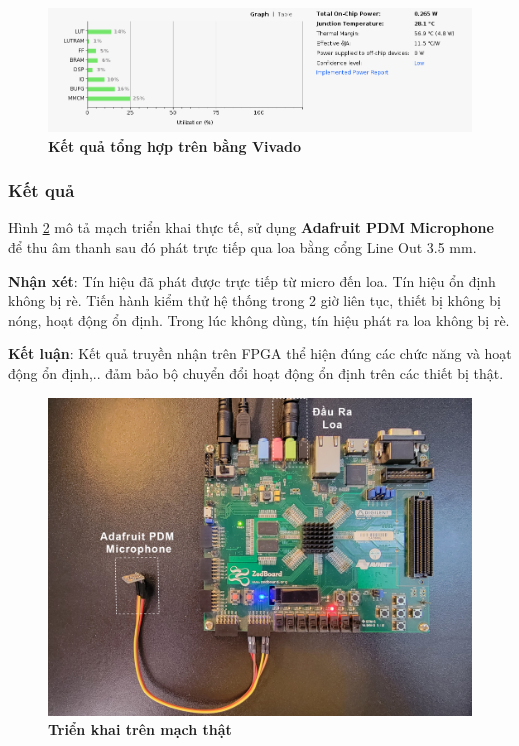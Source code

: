 \begin{figure}[H]
    \centering
    \includegraphics[width=14cm]{Images/Chuong5/fpga/syn_fpga.png}
    \caption[Kết quả tổng hợp trên bằng Vivado]{\bfseries \fontsize{12pt}{0pt}\selectfont Kết quả tổng hợp trên bằng Vivado}
    \label{syn_fpga}
\end{figure}

\subsubsection{Kết quả}

Hình \ref{machthat_2} mô tả mạch triển khai thực tế, sử dụng \textbf{Adafruit PDM Microphone} để thu âm thanh sau đó phát trực tiếp qua loa bằng cổng Line Out 3.5 mm.

\textbf{Nhận xét}: Tín hiệu đã phát được trực tiếp từ micro đến loa. Tín hiệu ổn định không bị rè. Tiến hành kiểm thử hệ thống trong 2 giờ liên tục, thiết bị không bị nóng, hoạt động ổn định. Trong lúc không dùng, tín hiệu phát ra loa không bị rè.

\textbf{Kết luận}: Kết quả truyền nhận trên FPGA thể hiện đúng các chức năng và hoạt động ổn định,.. đảm bảo bộ chuyển đổi hoạt động ổn định trên các thiết bị thật.


\begin{figure}[H]
    \centering
    \includegraphics[width=14cm]{Images/Chuong5/fpga/machthat_2.png}
    \caption[Triển khai trên mạch thật]{\bfseries \fontsize{12pt}{0pt}\selectfont Triển khai trên mạch thật}
    \label{machthat_2}
\end{figure}

